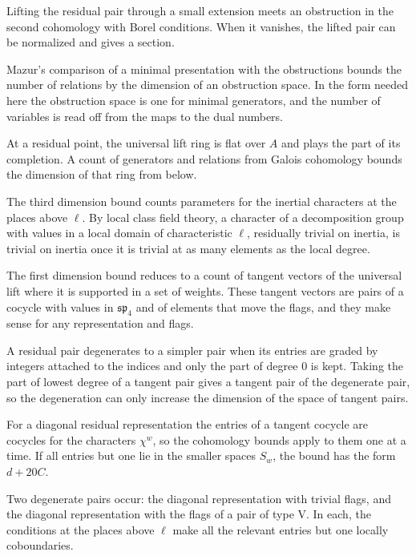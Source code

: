 Lifting the residual pair through a small extension meets an obstruction in the second cohomology with Borel conditions. When it vanishes, the lifted pair can be normalized and gives a section.

Mazur's comparison of a minimal presentation with the obstructions bounds the number of relations by the dimension of an obstruction space. In the form needed here the obstruction space is one for minimal generators, and the number of variables is read off from the maps to the dual numbers.

At a residual point, the universal lift ring is flat over $A$ and plays the part of its completion. A count of generators and relations from Galois cohomology bounds the dimension of that ring from below.

The third dimension bound counts parameters for the inertial characters at the places above $\ell$. By local class field theory, a character of a decomposition group with values in a local domain of characteristic $\ell$, residually trivial on inertia, is trivial on inertia once it is trivial at as many elements as the local degree.

The first dimension bound reduces to a count of tangent vectors of the universal lift where it is supported in a set of weights. These tangent vectors are pairs of a cocycle with values in $\mathfrak{sp}_4$ and of elements that move the flags, and they make sense for any representation and flags.

A residual pair degenerates to a simpler pair when its entries are graded by integers attached to the indices and only the part of degree $0$ is kept. Taking the part of lowest degree of a tangent pair gives a tangent pair of the degenerate pair, so the degeneration can only increase the dimension of the space of tangent pairs.

For a diagonal residual representation the entries of a tangent cocycle are cocycles for the characters $\chi^w$, so the cohomology bounds apply to them one at a time. If all entries but one lie in the smaller spaces $S_w$, the bound has the form $d+20C$.

Two degenerate pairs occur: the diagonal representation with trivial flags, and the diagonal representation with the flags of a pair of type V. In each, the conditions at the places above $\ell$ make all the relevant entries but one locally coboundaries.

